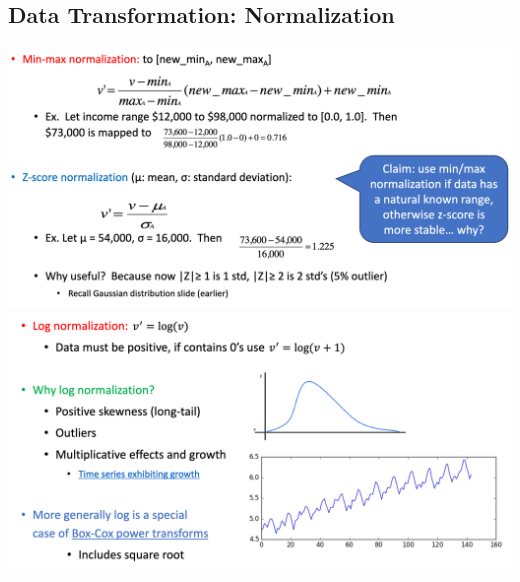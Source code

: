 \documentclass[11pt]{article}
\theoremstyle{definition}
\begin{document}
\subsection{Data Transformation: Normalization}
\includegraphics[width=\textwidth/2]{18.png}
\includegraphics[width=\textwidth/2]{19.png}
\end{document}
